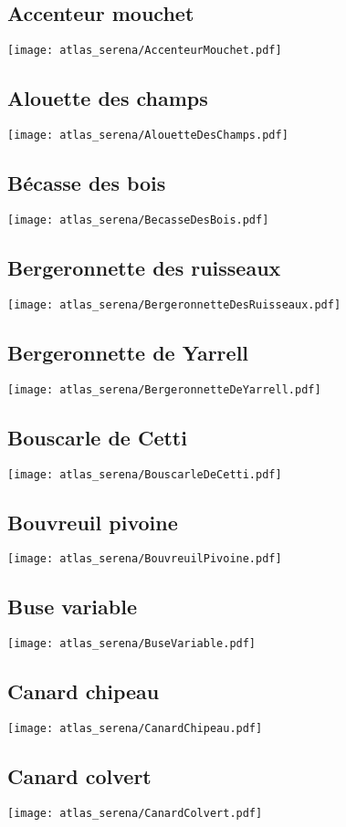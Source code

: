 \subsection{Accenteur mouchet}
\texttt{[image: atlas\_serena/AccenteurMouchet.pdf]}
\subsection{Alouette des champs}
\texttt{[image: atlas\_serena/AlouetteDesChamps.pdf]}
\subsection{Bécasse des bois}
\texttt{[image: atlas\_serena/BecasseDesBois.pdf]}
\subsection{Bergeronnette des ruisseaux}
\texttt{[image: atlas\_serena/BergeronnetteDesRuisseaux.pdf]}
\subsection{Bergeronnette de Yarrell}
\texttt{[image: atlas\_serena/BergeronnetteDeYarrell.pdf]}
\subsection{Bouscarle de Cetti}
\texttt{[image: atlas\_serena/BouscarleDeCetti.pdf]}
\subsection{Bouvreuil pivoine}
\texttt{[image: atlas\_serena/BouvreuilPivoine.pdf]}
\subsection{Buse variable}
\texttt{[image: atlas\_serena/BuseVariable.pdf]}
\subsection{Canard chipeau}
\texttt{[image: atlas\_serena/CanardChipeau.pdf]}
\subsection{Canard colvert}
\texttt{[image: atlas\_serena/CanardColvert.pdf]}
